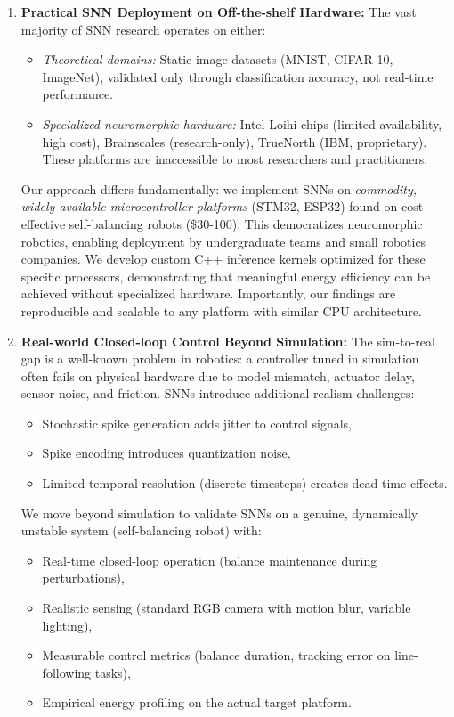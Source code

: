 \begin{enumerate}
    
\item \textbf{Practical SNN Deployment on Off-the-shelf Hardware:}
The vast majority of SNN research operates on either:
\begin{itemize}
    \item \textit{Theoretical domains:} Static image datasets (MNIST, CIFAR-10, ImageNet), validated only 
    through classification accuracy, not real-time performance.
    
    \item \textit{Specialized neuromorphic hardware:} Intel Loihi chips (limited availability, high cost), 
    Brainscales (research-only), TrueNorth (IBM, proprietary). These platforms are inaccessible to most 
    researchers and practitioners.
\end{itemize}

Our approach differs fundamentally: we implement SNNs on \emph{commodity, widely-available microcontroller 
platforms} (STM32, ESP32) found on cost-effective self-balancing robots (\$30-100). This democratizes neuromorphic 
robotics, enabling deployment by undergraduate teams and small robotics companies. We develop custom C++ inference 
kernels optimized for these specific processors, demonstrating that meaningful energy efficiency can be achieved 
without specialized hardware. Importantly, our findings are reproducible and scalable to any platform with similar 
CPU architecture.

    
\item \textbf{Real-world Closed-loop Control Beyond Simulation:}
The sim-to-real gap is a well-known problem in robotics: a controller tuned in simulation often fails on physical 
hardware due to model mismatch, actuator delay, sensor noise, and friction. SNNs introduce additional realism challenges:
\begin{itemize}
    \item Stochastic spike generation adds jitter to control signals,
    \item Spike encoding introduces quantization noise,
    \item Limited temporal resolution (discrete timesteps) creates dead-time effects.
\end{itemize}

We move beyond simulation to validate SNNs on a genuine, dynamically unstable system (self-balancing robot) with:
\begin{itemize}
    \item Real-time closed-loop operation (balance maintenance during perturbations),
    \item Realistic sensing (standard RGB camera with motion blur, variable lighting),
    \item Measurable control metrics (balance duration, tracking error on line-following tasks),
    \item Empirical energy profiling on the actual target platform.
\end{itemize}


\end{enumerate}
